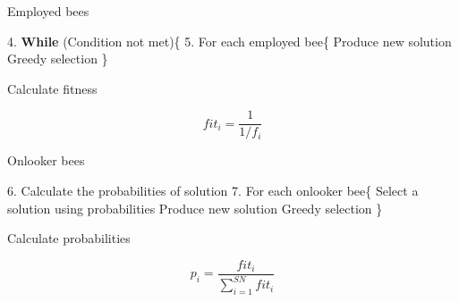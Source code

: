 \documentclass[14pt,ignorenonframetext,compress]{beamer}
\newenvironment{Shaded}{\begin{snugshade}}{\end{snugshade}}
\newcommand{\FloatTok}[1]{\textcolor[rgb]{0.00,0.00,0.81}{#1}}
\newcommand{\KeywordTok}[1]{\textcolor[rgb]{0.13,0.29,0.53}{\textbf{#1}}}
\newcommand{\NormalTok}[1]{#1}
\renewenvironment{Shaded}{\color{black}\begin{snugshade}\color{black}}{\end{snugshade}}
\begin{document}
\begin{frame}[fragile]{Employed bees}
\protect\hypertarget{employed-bees-1}{}

\begin{Shaded}
\begin{Highlighting}[]
 \FloatTok{4.} \KeywordTok{While}\NormalTok{ (Condition not met)\{}
 \FloatTok{5.}\NormalTok{ For each employed bee\{}
\NormalTok{     Produce new solution }
\NormalTok{     Greedy selection \}}
\end{Highlighting}
\end{Shaded}

\begin{block}{Calculate fitness}

\[fit_i = \frac{1}{1/f_i}\]

\end{block}

\end{frame}

\begin{frame}[fragile]{Onlooker bees}
\protect\hypertarget{onlooker-bees}{}

\begin{Shaded}
\begin{Highlighting}[]
 \FloatTok{6.}\NormalTok{ Calculate the probabilities of solution}
 \FloatTok{7.}\NormalTok{ For each onlooker bee\{  }
\NormalTok{     Select a solution using probabilities}
\NormalTok{     Produce new solution}
\NormalTok{     Greedy selection \}}
          
\end{Highlighting}
\end{Shaded}

\begin{block}{Calculate probabilities}

\[p_i = \frac{fit_i}{\sum^{SN}_{i=1} fit_i}\]

\end{block}

\end{frame}
\end{document}
